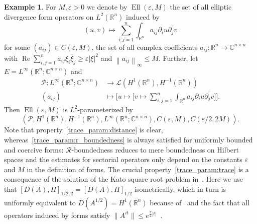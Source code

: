 \documentclass[reqno,a4paper,final]{amsart}
\numberwithin{equation}{section}
\theoremstyle{definition}
\newtheorem{example}[lemma]{Example}
\begin{document}
	 \begin{example}\label{ex:trace_elliptic}
	 	For $M, {\varepsilon} > 0$ we denote by $\operatorname{Ell}({\varepsilon}, M)$ the set of all elliptic divergence form operators on $L^2({\mathbb{R}}^n)$ induced by
		\begin{equation*}
			(u,v) \mapsto \sum_{i,j=1}^n \int_{{\mathbb{R}}^n} a_{ij} \partial_i u \overline{\partial_j v}
		\end{equation*}
		for some $(a_{ij}) \in C({\varepsilon}, M)$, the set of all complex coefficients $a_{ij} \colon {\mathbb{R}}^n \to {\mathbb{C}}^{n \times n}$ with ${\operatorname{Re}} \sum_{i,j=1}^n a_{ij} \xi_i \overline{\xi}_j \ge {\varepsilon} {\left\lvert{\xi}\right\rvert}^2$ and ${\left\lVert{a_{ij}}\right\rVert}_{\infty} \le M$. Further, let $E = L^{\infty}({\mathbb{R}}^n; {\mathbb{C}}^{n \times n})$ and
		\begin{align*}
			\mathcal{P}\colon L^{\infty}({\mathbb{R}}^n;{\mathbb{C}}^{n \times n}) & \to \mathcal{L}(H^1({\mathbb{R}}^n),H^{-1}({\mathbb{R}}^n)) \\
			(a_{ij}) & \mapsto \biggl[ u \mapsto \bigl[ v \mapsto \sum_{i,j=1}^n \int_{{\mathbb{R}}^n} a_{ij} \partial_i u \overline{\partial_j v} \bigr] \biggr].
		\end{align*}
		Then $\operatorname{Ell}({\varepsilon}, M)$ is $L^2$-parameterized by 
		\begin{equation*}
			(\mathcal{P}, H^1({\mathbb{R}}^n), H^{-1}({\mathbb{R}}^n), L^{\infty}({\mathbb{R}}^n; {\mathbb{C}}^{n \times n}), C({\varepsilon}, M), C({\varepsilon}/2, 2M)).
		\end{equation*} 
		Note that property~\ref{trace_param:distance} is clear, whereas~\ref{trace_param:r_boundedness} is always satisfied for uniformly bounded and coercive forms: $\mathcal{R}$-boundedness reduces to mere boundedness on Hilbert spaces and the estimates for sectorial operators only depend on the constants ${\varepsilon}$ and $M$ in the definition of forms. The crucial property~\ref{trace_param:trace} is a consequence of the solution of the Kato square root problem in~\cite[Theorem~6.1]{AHL+02}. Here we use that $[D(A),H]_{1/2,2} = [D(A),H]_{1/2}$ isometrically, which in turn is uniformly equivalent to $D(A^{1/2}) = H^1({\mathbb{R}}^n)$ because of~\cite[Proposition~2.5]{Fac15c} and the fact that all operators induced by forms satisfy ${\lVert{A^{it}}\rVert} \le e^{\frac{\pi}{2} {\left\lvert{t}\right\rvert}}$~\cite[Theorem~4.29]{Lun09}.
	 \end{example}
	 
\end{document}
